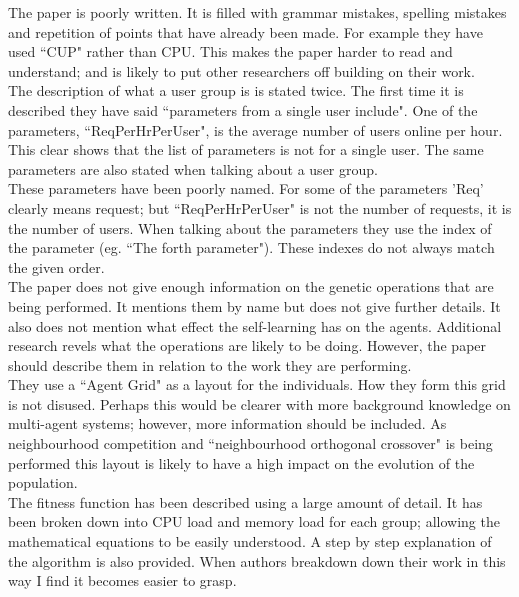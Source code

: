 \documentclass[10pt,a4paper,openbib]{article}
\begin{document}
\begin{multicols}{2}
\noindent The paper is poorly written. It is filled with grammar mistakes, spelling mistakes and repetition of points that have already been made. For example they have used ``CUP" rather than CPU. This makes the paper harder to read and understand; and is likely to put other researchers off building on their work.\\

\noindent The description of what a user group is is stated twice. The first time it is described they have said ``parameters from a single user include". One of the parameters, ``ReqPerHrPerUser", is the average number of users online per hour. This clear shows that the list of parameters is not for a single user. The same parameters are also stated when talking about a user group. \\

\noindent These parameters have been poorly named. For some of the parameters 'Req' clearly means request; but ``ReqPerHrPerUser" is not the number of requests, it is the number of users. When talking about the parameters they use the index of the parameter (eg. ``The forth parameter"). These indexes do not always match the given order. \\

\noindent The paper does not give enough information on the genetic operations that are being performed. It mentions them by name but does not give further details. It also does not mention what effect the self-learning has on the agents. Additional research revels what the operations are likely to be doing. However, the paper should describe them in relation to the work they are performing. \\

\noindent They use a ``Agent Grid" as a layout for the individuals. How they form this grid is not disused. Perhaps this would be clearer with more background knowledge on multi-agent systems; however, more information should be included. As neighbourhood competition and ``neighbourhood orthogonal crossover" is being performed this layout is likely to have a high impact on the evolution of the population. \\

\noindent The fitness function has been described using a large amount of detail. It has been broken down into CPU load and memory load for each group; allowing the mathematical equations to be easily understood. A step by step explanation of the algorithm is also provided. When authors breakdown down their work in this way I find it becomes easier to grasp.\\


\end{multicols}
\end{document}
